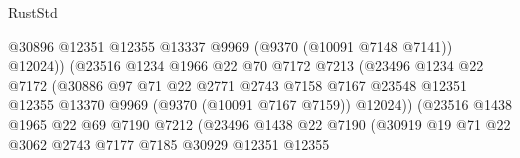 \begin{lexlean}{RustStd}
\begin{coremodule}
{\begin{coremodule}
{{{{{{{{{{{{{{{{{{{{{{{{{{{{{{{{{{{{{{{                                        @30896
                                        @12351
                                        @12355
                                        @13337
                                        @9969
                                        (@9370 (@10091 @7148 @7141))
                                        @12024))
                                    (@23516
                                      @1234
                                      @1966
                                      @22
                                      @70
                                      @7172
                                      @7213
                                      (@23496
                                        @1234
                                        @22
                                        @7172
                                        (@30886
                                          @97
                                          @71
                                          @22
                                          @2771
                                          @2743
                                          @7158
                                          @7167
                                          @23548
                                          @12351
                                          @12355
                                          @13370
                                          @9969
                                          (@9370 (@10091 @7167 @7159))
                                          @12024))
                                      (@23516
                                        @1438
                                        @1965
                                        @22
                                        @69
                                        @7190
                                        @7212
                                        (@23496
                                          @1438
                                          @22
                                          @7190
                                          (@30919
                                            @19
                                            @71
                                            @22
                                            @3062
                                            @2743
                                            @7177
                                            @7185
                                            @30929
                                            @12351
                                            @12355
}}}}}}}}}}}}}}}}}}}}}}}}}}}}}}}}}}}}}}}
\end{coremodule}}
\end{coremodule}
\end{lexlean}
